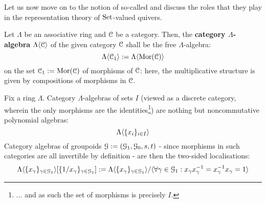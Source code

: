             Let us now move on to the notion of so-called  and discuss the roles that they play in the representation theory of $\mathrm{Set}$-valued quivers. 
            \begin{definition} \label{def: category_algebras}
                Let $\Lambda$ be an associative ring and $\mathcal{C}$ be a category. Then, the \textbf{category $\Lambda$-algebra} $\Lambda\langle\mathcal{C}\rangle$ of the given category $\mathcal{C}$ shall be the free $\Lambda$-algebra:
                    $$\Lambda\langle\mathcal{C}_1\rangle := \Lambda\langle\mathrm{Mor}(\mathcal{C})\rangle$$
                on the set $\mathcal{C}_1 := \mathrm{Mor}(\mathcal{C})$ of morphisms of $\mathcal{C}$: here, the multiplicative structure is given by compositions of morphisms in $\mathcal{C}$.
            \end{definition}
            \begin{example}
                Fix a ring $\Lambda$. Category $\Lambda$-algebras of sets $I$ (viewed as a discrete category, wherein the only morphisms are the identities\footnote{... and as such the set of morphisms is precisely $I$.}) are nothing but noncommutative polynomial algebras:
                    $$\Lambda\langle\{x_i\}_{i \in I}\rangle$$
                Category algebras of groupoids $\mathcal{G} := (\mathcal{G}_1, \mathcal{G}_0, s, t)$ - since morphisms in such categories are all invertible by definition - are then the two-sided localisations:
                    $$\Lambda\langle\{x_{\gamma}\}_{\gamma \in \mathcal{G}_1}\rangle[\{1/x_\gamma\}_{\gamma \in \mathcal{G}_1}] := \Lambda\langle\{x_\gamma\}_{\gamma \in \mathcal{G}_1}\rangle/\langle\forall \gamma \in \mathcal{G}_1: x_{\gamma} x_{\gamma}^{-1} = x_{\gamma}^{-1} x_{\gamma} = 1\rangle$$
            \end{example}

